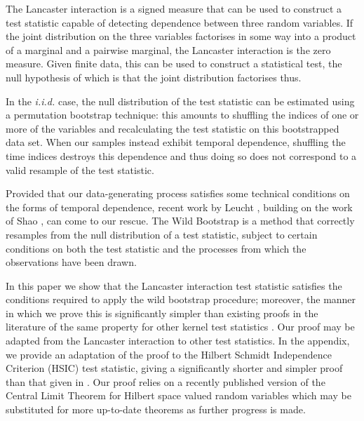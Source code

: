 \documentclass[]{article}
\begin{document}
The Lancaster interaction \cite{lancaster1969chi}\cite{sejdinovic2013kernel} is a signed measure that can be used to construct a test statistic capable of detecting dependence between three random variables. If the joint distribution on the three variables factorises in some way into a product of a marginal and a pairwise marginal, the Lancaster interaction is the zero measure. Given finite data, this can be used to construct a statistical test, the null hypothesis of which is that the joint distribution factorises thus. 	

In the \emph{i.i.d. } case, the null distribution of the test statistic can be estimated using a permutation bootstrap technique: this amounts to shuffling the indices of one or more of the variables and recalculating the test statistic on this bootstrapped data set. When our samples instead exhibit temporal dependence, shuffling the time indices destroys this dependence and thus doing so does not correspond to a valid resample of the test statistic. 

Provided that our data-generating process satisfies some technical conditions on the forms of temporal dependence, recent work by Leucht \cite{leucht2013dependent}, building on the work of Shao \cite{shao2010dependent}, can come to our rescue. The Wild Bootstrap is a method that correctly resamples from the null distribution of a test statistic, subject to certain conditions on both the test statistic and the processes from which the observations have been drawn.

In this paper we show that the Lancaster interaction test statistic satisfies the conditions required to apply the wild bootstrap procedure; moreover, the manner in which we prove this is significantly simpler than existing proofs in the literature of the same property for other kernel test statistics \cite{chwialkowski2014wild}\cite{chwialkowski2014kernel}. Our proof may be adapted from the Lancaster interaction to other test statistics. In the appendix, we provide an adaptation of the proof to the Hilbert Schmidt Independence Criterion (HSIC) test statistic, giving a significantly shorter and simpler proof than that given in \cite{chwialkowski2014kernel}. Our proof relies on a recently published version of the Central Limit Theorem for Hilbert space valued random variables \cite{dehling2015bootstrap} which may be substituted for more up-to-date theorems as further progress is made.
\end{document}
